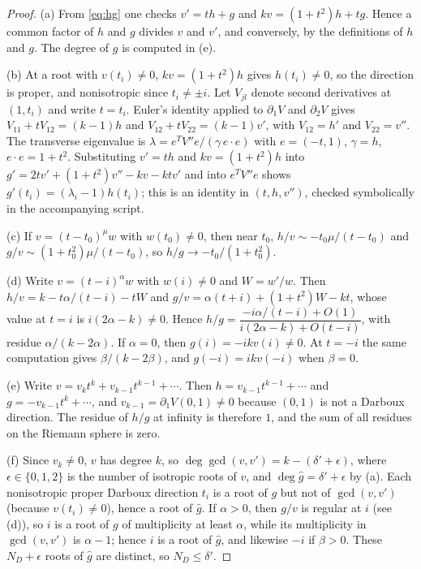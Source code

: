 \documentclass[11pt]{article}
\numberwithin{equation}{section}
\theoremstyle{definition}
\theoremstyle{remark}
\begin{document}
\begin{proof}
(a) From \eqref{eq:hg} one checks $v'=th+g$ and $kv=(1+t^2)h+tg$. Hence a common factor of $h$ and $g$ divides
$v$ and $v'$, and conversely, by the definitions of $h$ and $g$. The degree of $g$ is computed in (e).

(b) At a root with $v(t_i)\ne0$, $kv=(1+t^2)h$ gives $h(t_i)\ne0$, so the direction is proper, and nonisotropic since
$t_i\ne\pm i$. Let $V_{jl}$ denote second derivatives at $(1,t_i)$ and write $t=t_i$. Euler's identity applied to
$\partial_1V$ and $\partial_2V$ gives $V_{11}+tV_{12}=(k-1)h$ and $V_{12}+tV_{22}=(k-1)v'$, with $V_{12}=h'$ and
$V_{22}=v''$. The transverse eigenvalue is $\lambda=e^{T}V''e/(\gamma\,e\cdot e)$ with $e=(-t,1)$, $\gamma=h$,
$e\cdot e=1+t^2$. Substituting $v'=th$ and $kv=(1+t^2)h$ into $g'=2tv'+(1+t^2)v''-kv-ktv'$ and into $e^TV''e$ shows
$g'(t_i)=(\lambda_i-1)h(t_i)$; this is an identity in $(t,h,v'')$, checked symbolically in the accompanying script.

(c) If $v=(t-t_0)^\mu w$ with $w(t_0)\ne0$, then near $t_0$, $h/v\sim-t_0\mu/(t-t_0)$ and
$g/v\sim(1+t_0^2)\mu/(t-t_0)$, so $h/g\to-t_0/(1+t_0^2)$.

(d) Write $v=(t-i)^\alpha w$ with $w(i)\ne0$ and $W=w'/w$. Then $h/v=k-t\alpha/(t-i)-tW$ and
$g/v=\alpha(t+i)+(1+t^2)W-kt$, whose value at $t=i$ is $i(2\alpha-k)\ne0$. Hence
$h/g=\dfrac{-i\alpha/(t-i)+O(1)}{i(2\alpha-k)+O(t-i)}$, with residue $\alpha/(k-2\alpha)$. If $\alpha=0$, then
$g(i)=-ikv(i)\ne0$. At $t=-i$ the same computation gives $\beta/(k-2\beta)$, and $g(-i)=ikv(-i)$ when $\beta=0$.

(e) Write $v=v_kt^k+v_{k-1}t^{k-1}+\cdots$. Then $h=v_{k-1}t^{k-1}+\cdots$ and $g=-v_{k-1}t^k+\cdots$, and
$v_{k-1}=\partial_1V(0,1)\ne0$ because $(0,1)$ is not a Darboux direction. The residue of $h/g$ at infinity is
therefore $1$, and the sum of all residues on the Riemann sphere is zero.

(f) Since $v_k\ne0$, $v$ has degree $k$, so $\deg\gcd(v,v')=k-(\delta'+\epsilon)$, where $\epsilon\in\{0,1,2\}$ is the
number of isotropic roots of $v$, and $\deg\hat g=\delta'+\epsilon$ by (a). Each nonisotropic proper Darboux direction
$t_i$ is a root of $g$ but not of $\gcd(v,v')$ (because $v(t_i)\ne0$), hence a root of $\hat g$. If $\alpha>0$, then
$g/v$ is regular at $i$ (see (d)), so $i$ is a root of $g$ of multiplicity at least $\alpha$, while its multiplicity in
$\gcd(v,v')$ is $\alpha-1$; hence $i$ is a root of $\hat g$, and likewise $-i$ if $\beta>0$. These $N_D+\epsilon$ roots
of $\hat g$ are distinct, so $N_D\le\delta'$.
\end{proof}
\end{document}
